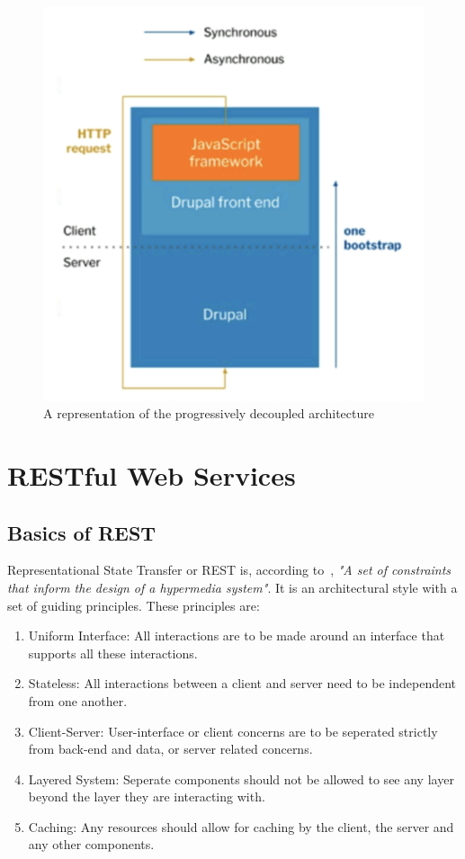 \begin{figure}
	\centering
	\includegraphics{./img/Progressively_Decoupled.png}
	\caption[Progressively decoupled CMS architecture]{A representation of the progressively decoupled architecture ~\autocite{So2018}}
\end{figure}

\section{RESTful Web Services}
\subsection{Basics of REST}
Representational State Transfer or REST is, according to~\textcite{Wilde2011}, \emph{"A set of constraints that inform the design of a hypermedia system"}. It is an architectural style with a set of guiding principles. These principles are: 
\begin{enumerate}
	\item Uniform Interface: All interactions are to be made around an interface that supports all these interactions.
	\item  Stateless: All interactions between a client and server need to be independent from one another.
	\item Client-Server: User-interface or client concerns are to be seperated strictly from back-end and data, or server related concerns.
	\item Layered System: Seperate components should not be allowed to see any layer beyond the layer they are interacting with.
	\item Caching: Any resources should allow for caching by the client, the server and any other components.
\end{enumerate}

